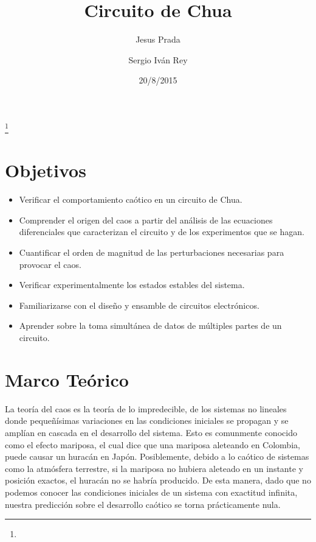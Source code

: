 \documentclass[%
 reprint,
%
 amsmath,amssymb,
 aps,
]{revtex4-1}
\begin{document}

\title{Circuito de Chua}%
\thanks{}%

\author{Jesus Prada}
\author{Sergio Iv\'an Rey}%
%

\date{20/8/2015}%


\maketitle

\section{\label{sec:level1}Objetivos}
\begin{itemize}
\item Verificar el comportamiento caótico en un circuito de Chua.
\item Comprender el origen del caos a partir del análisis de las ecuaciones diferenciales que caracterizan el circuito y de los experimentos que se hagan.
\item Cuantificar el orden de magnitud de las perturbaciones necesarias para provocar el caos. 
\item Verificar experimentalmente los estados estables del sistema.
\item Familiarizarse con el diseño y ensamble de circuitos electrónicos.
\item Aprender sobre la toma simultánea de datos de múltiples partes de un circuito.

\end{itemize}

\section{\label{sec:level1}Marco Teórico}
La teoría del caos es la teoría de lo impredecible, de los sistemas no lineales donde pequeñísimas variaciones en las condiciones iniciales se propagan y se amplían en cascada en el desarrollo del sistema. Esto es comunmente conocido como el efecto mariposa, el cual dice que una mariposa aleteando en Colombia, puede causar un huracán en Japón. Posiblemente, debido a lo caótico de sistemas como la atmósfera terrestre, si la mariposa no hubiera aleteado en un instante y posición exactos, el huracán no se habría producido. De esta manera, dado que no podemos conocer las condiciones iniciales de un sistema con exactitud infinita, nuestra predicción sobre el desarrollo caótico se torna prácticamente nula.\\
\end{document}
